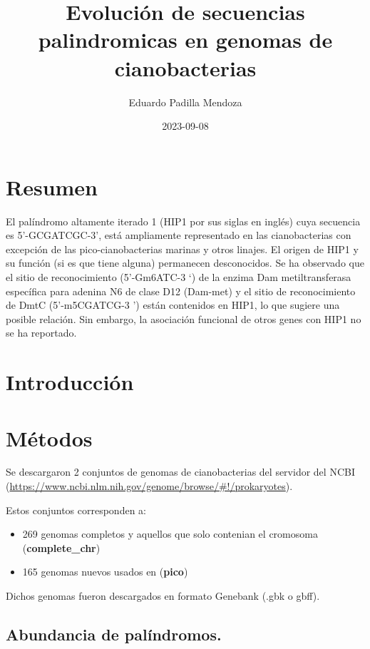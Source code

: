\documentclass[
]{book}
\title{Evolución de secuencias palindromicas en genomas de cianobacterias}
\author{Eduardo Padilla Mendoza}
\date{2023-09-08}
\providecommand{\tightlist}{%
  \setlength{\itemsep}{0pt}\setlength{\parskip}{0pt}}
\begin{document}
\maketitle

{
\setcounter{tocdepth}{1}
\tableofcontents
}
\hypertarget{resumen}{%
\chapter*{Resumen}\label{resumen}}

El palíndromo altamente iterado 1 (HIP1 por sus siglas en inglés) cuya secuencia es 5'-GCGATCGC-3', está ampliamente representado en las cianobacterias con excepción de las pico-cianobacterias marinas y otros linajes. El origen de HIP1 y su función (si es que tiene alguna) permanecen desconocidos. Se ha observado que el sitio de reconocimiento (5'-Gm6ATC-3 `) de la enzima Dam metiltransferasa específica para adenina N6 de clase D12 (Dam-met) y el sitio de reconocimiento de DmtC (5'-m5CGATCG-3 ') están contenidos en HIP1, lo que sugiere una posible relación. Sin embargo, la asociación funcional de otros genes con HIP1 no se ha reportado.

\hypertarget{introducciuxf3n}{%
\chapter{Introducción}\label{introducciuxf3n}}

\hypertarget{muxe9todos}{%
\chapter{Métodos}\label{muxe9todos}}

Se descargaron 2 conjuntos de genomas de cianobacterias del servidor del NCBI (\url{https://www.ncbi.nlm.nih.gov/genome/browse/\#!/prokaryotes}).

Estos conjuntos corresponden a:

\begin{itemize}
\tightlist
\item
  269 genomas completos y aquellos que solo contenian el cromosoma (\textbf{complete\_chr})
\item
  165 genomas nuevos usados en \citet{cabello2022elucidating} (\textbf{pico})
\end{itemize}

Dichos genomas fueron descargados en formato Genebank (.gbk o gbff).

\hypertarget{abundancia-de-paluxedndromos.}{%
\section{Abundancia de palíndromos.}\label{abundancia-de-paluxedndromos.}}
\end{document}

